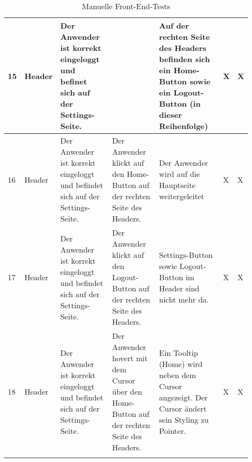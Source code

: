 \begin{longtable}{| p{} | p{} | p{} | p{} | p{} | p{} | p{} |}
	15 & Header & Der Anwender ist korrekt eingeloggt und befinet sich auf der Settings-Seite. & & Auf der rechten Seite des Headers befinden sich ein Home-Button sowie ein Logout-Button (in dieser Reihenfolge) & X & X \\ \hline
	
	16 & Header & Der Anwender ist korrekt eingeloggt und befindet sich auf der Settings-Seite. & Der Anwender klickt auf den Home-Button auf der rechten Seite des Headers. & Der Anwender wird auf die Hauptseite weitergeleitet & X & X \\ \hline
	
	17 & Header & Der Anwender ist korrekt eingeloggt und befindet sich auf der Settings-Seite. & Der Anwender klickt auf den Logout-Button auf der rechten Seite des Headers. & Settings-Button sowie Logout-Button im Header sind nicht mehr da. & X & X \\ \hline
	
	18 & Header & Der Anwender ist korrekt eingeloggt und befindet sich auf der Settings-Seite. & Der Anwender hovert mit dem Cursor über den Home-Button auf der rechten Seite des Headers. & Ein Tooltip (Home) wird neben dem Cursor angezeigt. Der Cursor ändert sein Styling zu Pointer. & X & X \\ \hline
	
	\caption{Manuelle Front-End-Tests}
	\label{tab:manuelle_front_end_tests}
\end{longtable}

